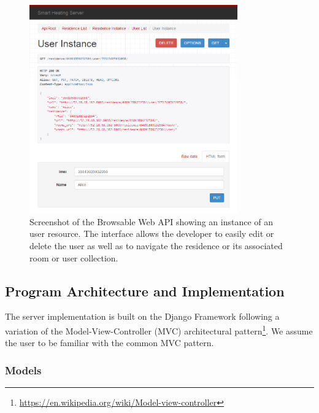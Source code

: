 \begin{figure}[h]
	\begin{center}
		\includegraphics[width=0.8\textwidth]{images/server_browable_api_user_instance.png}
	\end{center}
	\caption{Screenshot of the Browsable Web API showing an instance of an user resource. The interface allows the developer to easily edit or delete the user as well as to navigate the residence or its associated room or user collection.}
	\label{fig:server_infrastructure_browsable_api}
\end{figure}


\subsection{Program Architecture and Implementation}

The server implementation is built on the Django Framework following a variation
of the Model-View-Controller (MVC) architectural pattern\footnote{\url{https://en.wikipedia.org/wiki/Model-view-controller}}.
We assume the user to be familiar with the common MVC pattern.

\subsubsection{Models}
\label{sec:server_infrastructure_models}

